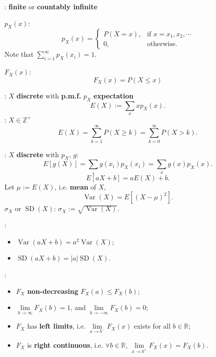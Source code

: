 : \textbf{finite} or \textbf{countably infinite}

 \(p_X(x)\):
\begin{equation*}
p_X(x) = \begin{cases}P(X=x), & \text{if }x = x_1, x_2, \cdots \\ 0, & 
\text{otherwise}.\end{cases}
\end{equation*}
Note that \(\sum\limits_{i=1}^{\infty}p_X(x_i) = 1\).

 \(F_X(x)\):
\[F_X(x) = P(X \leq x)\]

: \(X\) \textbf{discrete} with \textbf{p.m.f.}
\(p_X\) \tf \textbf{expectation}
\begin{equation*}
  E(X) := \sum\limits_{x}xp_X(x).
\end{equation*}
: \(X \in \mathbb{Z}^+\) \tf
\begin{equation*}
E(X) = \sum\limits_{k=1}^{\infty}P(X \geq k) = 
\sum\limits_{k=0}^{\infty}P(X > k).
\end{equation*}

: \(X\) \textbf{discrete} with \(p_X\),
\(g\):
\begin{equation*}
  E[g(X)] = \sum_i g(x_i)p_X(x_i) = \sum_x g(x)p_X(x).
\end{equation*}
\[E[aX + b] = aE(X)+ b.\]
 Let \(\mu := E(X)\), i.e. \textbf{mean} of \(X\),
\[ \operatorname{Var}\left(X\right)=E[(X-\mu)^2]. \]
\(\sigma_X\) or \(\operatorname{SD}\left(X\right)\):
\(\sigma_X := \sqrt{\operatorname{Var}\left(X\right)}.\)

: 
\begin{multicols}{2}
\begin{itemize}
  \item \(\operatorname{Var}\left(aX+b\right)=a^2\operatorname{Var}
    \left(X\right)\);
  \item \(\operatorname{SD}\left(aX+b\right)=|a|\operatorname{SD}
    \left(X\right)\).
\end{itemize}
\end{multicols}

:
\begin{itemize}
  \item \(F_X\) \textbf{non-decreasing} \tf \(F_X(a) \leq F_X(b)\);
  \item \(\lim\limits_{b\rightarrow \infty}F_X(b) = 1\), and
    \(\lim\limits_{b\rightarrow -\infty}F_X(b) = 0\);
  \item \(F_X\) has \textbf{left limits}, i.e. \(\lim\limits_{x\rightarrow
    b^-}F_X(x)\) exists for all \(b\in \mathbb{R}\);
  \item \(F_X\) is \textbf{right continuous}, i.e. \(\forall b \in
    \mathbb{R}\), \(\lim\limits_{x\rightarrow b^+}F_X(x) = F_X(b)\).
\end{itemize}

